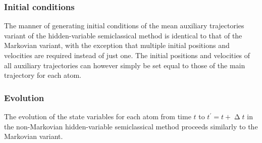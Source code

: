 \subsubsection{Initial conditions}
The manner of generating initial conditions of the mean auxiliary trajectories variant of the hidden-variable semiclassical method is identical to that of the Markovian variant, with the exception that multiple initial positions and velocities are required instead of just one. The initial positions and velocities of all auxiliary trajectories can however simply be set equal to those of the main trajectory for each atom.

\subsubsection{Evolution}

The evolution of the state variables for each atom from time $t$ to $t^\prime = t + \upDelta t$ in the non-Markovian hidden-variable semiclassical method proceeds similarly to the Markovian variant.

